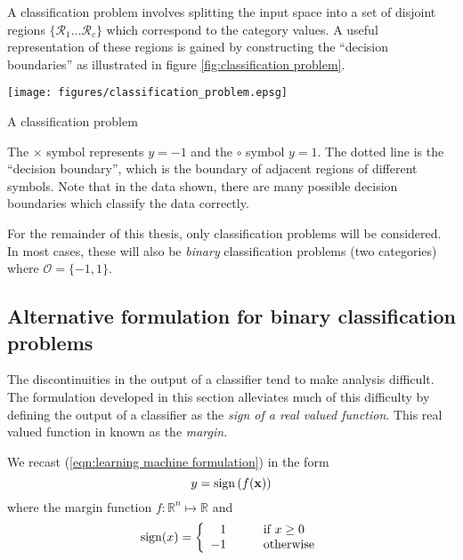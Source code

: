 A classification problem involves splitting the input space
into a set of disjoint regions $\{ \mathcal{R}_1 \ldots \mathcal{R}_c
\}$ which correspond to the category values.  A useful representation
of these regions is gained by constructing the ``decision boundaries''
as illustrated in figure \ref{fig:classification problem}.

\begin{linefigure}
\begin{center}
\texttt{[image: figures/classification\_problem.epsg]}
\end{center}
\caption{A classification problem}
\label{fig:classification problem}
The $\times$ symbol represents $y=-1$ and the $\circ$ symbol $y=1$.
The dotted line is the ``decision boundary'', which is the boundary of
adjacent regions of different symbols.  Note that in the data shown,
there are many possible decision boundaries which classify the data
correctly.
\end{linefigure}

For the remainder of this thesis, only classification problems will be
considered.  In most cases, these will also be \emph{binary}
classification problems (two categories) where $\mathcal{O} = \{-1,
1\}$.

\subsection{Alternative formulation for binary classification problems}

The discontinuities in the output of a classifier tend to make
analysis difficult.  The formulation developed in this section
alleviates much of this difficulty by defining the output of a
classifier as the  \emph{sign of a real valued function}.  This real
valued function in known as the \emph{margin}.

We recast (\ref{eqn:learning machine formulation}) in the form
%
\begin{equation}
y = \mathrm{sign} \left( f(\mathbf{x}) \right)
\label{eqn:marginal classification formulation}
\end{equation}
%
where the margin function $f : \mathbb{R}^n \mapsto \mathbb{R}$ and
%
\begin{equation}
\mathrm{sign} (x) = \left\{ \begin{array}{rl}
1	& \qquad \mbox{if $x \geq 0$} \\
-1	& \qquad \mbox{otherwise}
\end{array} \right.
\end{equation}
%

